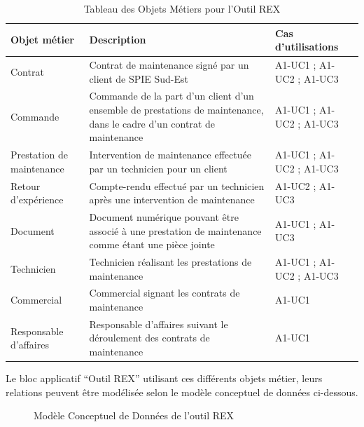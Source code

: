 \begin{table}[H]
    \begin{tabular}{p{3cm}|p{10cm}|p{3cm}}
    Objet métier & Description & Cas d'utilisations \\ \hline
    Contrat & Contrat de maintenance signé par un client de SPIE Sud-Est & A1-UC1 ; A1-UC2 ; A1-UC3 \\ \hline
    Commande & Commande de la part d’un client d’un ensemble de prestations de maintenance, dans le cadre d’un contrat de maintenance & A1-UC1 ; A1-UC2 ; A1-UC3 \\ \hline
    Prestation de maintenance & Intervention de maintenance effectuée par un technicien pour un client & A1-UC1 ; A1-UC2 ; A1-UC3 \\ \hline
    Retour d’expérience & Compte-rendu effectué par un technicien après une intervention de maintenance & A1-UC2 ; A1-UC3 \\ \hline
    Document & Document numérique pouvant être associé à une prestation de maintenance comme étant une pièce jointe & A1-UC1 ;
A1-UC3 \\
    Technicien & Technicien réalisant les prestations de maintenance & A1-UC1 ; A1-UC2 ; A1-UC3 \\ \hline
    Commercial & Commercial signant les contrats de maintenance & A1-UC1 \\ \hline
    Responsable d’affaires & Responsable d’affaires suivant le déroulement des contrats de maintenance & A1-UC1 \\
    \end{tabular}
    \caption{Tableau des Objets Métiers pour l'Outil REX}
\end{table}

Le bloc applicatif “Outil REX” utilisant ces différents objets métier, leurs relations peuvent être modélisée selon le modèle conceptuel de données ci-dessous.

\begin{figure}[H]
    \label{fig-om-rex}
    \noindent{}
    \caption{Modèle Conceptuel de Données de l'outil REX}
\end{figure}

